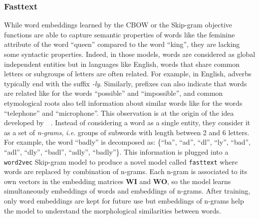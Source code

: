     \subsubsection{Fasttext}
      While word embeddings learned by the CBOW or the Skip-gram objective
      functions are able to capture semantic properties of words like the
      feminine attribute of the word ``queen'' compared to the word ``king'',
      they are lacking some syntactic properties. Indeed, in those models, words
      are considered as global independent entities but in languages like
      English, words that share common letters or subgroups of letters are often
      related.  For example, in English, adverbs typically end with the suffix
      \textit{-ly}.  Similarly, prefixes can also indicate that words are
      related like for the words ``possible'' and ``impossible'', and common
      etymological roots also tell information about similar words like for the
      words ``telephone'' and ``microphone''.  This observation is at the origin
      of the idea developed
      by~\citeauthor{bojanowski2016enriching}~\citep{bojanowski2016enriching}.
      Instead of considering a word as a single entity, they consider it as a
      set of \textit{n-grams}, \textit{i.e.} groups of subwords with length
      between 2 and 6 letters. For example, the word ``badly'' is decomposed as:
      \{``ba'', ``ad'', ``dl'', ``ly'', ``bad'', ``adl'', ``dly'', ``badl'',
      ``adly'', ``badly''\}. This information is plugged into a
      \texttt{word2vec} Skip-gram model to produce a novel model called
      \texttt{fasttext} where words are replaced by combination of n-grams. Each
      n-gram is associated to its own vectors in the embedding matrices
      \textbf{WI} and \textbf{WO}, so the model learns simultaneously embeddings
      of words and embeddings of n-grams. After training, only word embeddings
      are kept for future use but embeddings of n-grams help the model to
      understand the morphological similarities between words. \medskip

